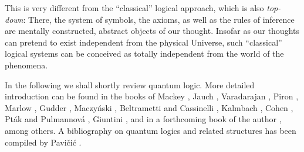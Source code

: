 \documentclass[%
  preprint,
 showpacs,
 showkeys,
 preprintnumbers,
 amsmath,amssymb,
 aps,
 rmp,
  longbibliography,
 ]{revtex4-1}
\begin{document}
This is very different from the ``classical''  logical approach, which
is also {\em top-down}: There, the system of symbols, the axioms, as
well as the rules of inference are mentally constructed,
abstract objects of
our thought.
Insofar as our thoughts can pretend to exist independent from
the physical Universe, such ``classical'' logical systems can be
conceived as totally independent from the world of the
phenomena.


In the following we shall shortly review quantum logic. More
detailed introduction can be found in the books of
 Mackey
\cite{ma-57},
 Jauch
\cite{jauch},
Varadarajan \cite{varadarajanI,varadarajanII},
Piron
\cite{piron-76},
Marlow
\cite{marlow},
Gudder
\cite{gudder:79,gudder},  Maczy\'nski \cite{maczy},
Beltrametti and  Cassinelli
\cite{bell-cas},
Kalmbach
\cite{kalmbach-83,kalmbach-86},
Cohen
\cite{cohen},
Pt{\'{a}}k and Pulmannov{\'{a}}
\cite{pulmannova-91},
Giuntini
\cite{giuntini-91}, and in a forthcoming book of the author
\cite{svozil-ql},
among
others. A  bibliography on quantum logics and related
structures has been compiled by
 Pavi{\v{c}}i{\'{c}} \cite{pavicic-92}.
\end{document}
